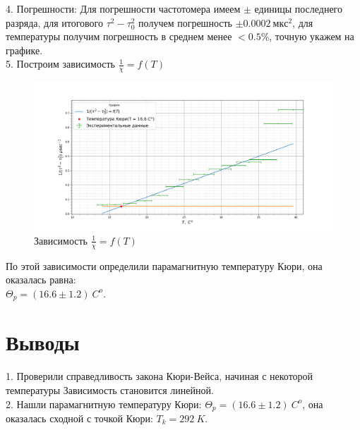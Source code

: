 \documentclass[a4paper, 12pt]{article}%
\begin{document}
	4. Погрешности: Для погрешности частотомера имеем $\pm$ единицы последнего разряда, для итогового $\tau^2 - \tau_0^2$ получем погрешность $\pm 0.0002~мкс^2$, для температуры получим погрешность в среднем менее $< 0.5 \%$, точную укажем на графике.\\
	5. Построим зависимость $\frac{1}{\chi} = f(T)$\\
	\begin{figure}[H]
		\centering
		\includegraphics[width=0.9\linewidth]{temp}
		\caption{Зависимость $\frac{1}{\chi} = f(T)$}
		\label{fig:temp}
	\end{figure}
	По этой зависимости определили парамагнитную температуру Кюри, она оказалась равна:\\ $\Theta_p = (16.6\pm1.2)~C^o$.\\
	\section{Выводы}
	1. Проверили справедливость закона Кюри-Вейса, начиная с некоторой температуры Зависимость становится линейной.\\
	2. Нашли парамагнитную температуру Кюри: $\Theta_p = (16.6\pm1.2)~C^o$, она оказалась сходной с точкой Кюри: $T_k = 292~K$.\\
\end{document}
